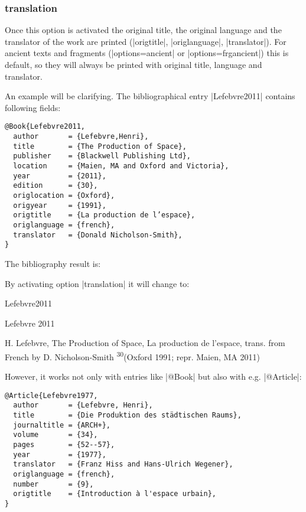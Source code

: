 \documentclass[a4paper,
10pt,
greek,
french,
spanish,
italian,
ngerman,
english
]{ltxdoc}
\begin{document}
\subsubsection{translation}\label{translation}
Once this option is activated the original title, the original language and the translator of the work are printed (|origtitle|, |origlanguage|, |translator|).
For ancient texts and fragments (|options={ancient}| or |options={frgancient}|) this is default, so they will always be printed with original title, language and translator.

An example will be clarifying.
The bibliographical entry |Lefebvre2011| contains following fields:
\begin{lstlisting}[style=bibentry,label=Lefebvre2011,caption={{@}Book\{Lefebvre2011,…\}}]
@Book{Lefebvre2011,
  author       = {Lefebvre,Henri},
  title        = {The Production of Space},
  publisher    = {Blackwell Publishing Ltd},
  location     = {Maien, MA and Oxford and Victoria},
  year         = {2011},
  edition      = {30},
  origlocation = {Oxford},
  origyear     = {1991},
  origtitle    = {La production de l’espace},
  origlanguage = {french},
  translator   = {Donald Nicholson-Smith},
}
\end{lstlisting}

The bibliography result is:

By activating option |translation| it will change to:

\begin{bibbsp}{Lefebvre2011}%
\parbox[t]{2cm}{Lefebvre 2011} \parbox[t]{9cm}{H. Lefebvre,  The Production of Space, {\color{red} La production de l’espace, trans. from French by D. Nicholson-Smith} \textsuperscript{30}(Oxford 1991; repr. Maien, MA 2011)}
\end{bibbsp}
 
However, it works not only with entries like |@Book| but also with e.g. |@Article|:

\begin{lstlisting}[style=bibentry,label=Lefebvre1977,caption={{@}Article\{Lefebvre1977,…\} }]
@Article{Lefebvre1977,
  author       = {Lefebvre, Henri},
  title        = {Die Produktion des städtischen Raums},
  journaltitle = {ARCH+},
  volume       = {34},
  pages        = {52--57},
  year         = {1977},
  translator   = {Franz Hiss and Hans-Ulrich Wegener},
  origlanguage = {french},
  number       = {9},
  origtitle    = {Introduction à l'espace urbain},
}
\end{lstlisting}
\end{document}
